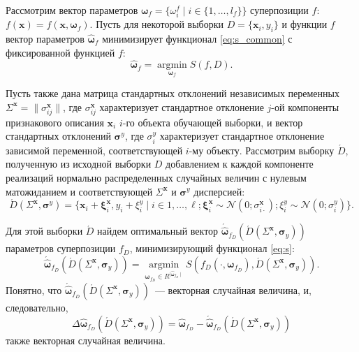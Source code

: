 \documentclass[12pt,a4paper]{article}
\theoremstyle{definition}
\begin{document}
Рассмотрим вектор параметров
$\boldsymbol{\omega}_f = \{ \omega_i^f \mid i \in \{ 1, \dots, l_f \} \}$
суперпозиции $f$: $f(\mathbf{x}) = f(\mathbf{x}, \boldsymbol{\omega}_f)$.
Пусть для некоторой выборки $D = \{ \mathbf{x}_i, y_i \}$ и функции
$f$ вектор параметров $\hat{\boldsymbol{\omega}}_f$ минимизирует
функционал \eqref{eq:s_common} с фиксированной функцией $f$:
\[
  \hat{\boldsymbol{\omega}}_f = \mathop{\arg \min}\limits_{\boldsymbol{\omega}_f} S(f, D).
\]

Пусть также дана матрица стандартных отклонений
независимых переменных $\Sigma^{\mathbf{x}} = \| \sigma^{\mathbf{x}}_{ij} \|$,
где $\sigma^{\mathbf{x}}_{ij}$ характеризует стандартное отклонение $j$-ой
компоненты признакового описания $\mathbf{x}_i$ $i$-го объекта обучающей выборки,
и вектор стандартных отклонений $\boldsymbol{\sigma}^y$, где $\sigma^y_i$
характеризует стандартное отклонение зависимой переменной, соответствующей
$i$-му объекту.
Рассмотрим выборку $\acute{D}$, полученную из исходной выборки $D$
добавлением к каждой компоненте реализаций нормально распределенных
случайных величин с нулевым матожиданием и соответствующей
$\Sigma^{\mathbf{x}}$ и $\boldsymbol{\sigma}^y$ дисперсией:
\begin{equation}
  \acute{D}(\Sigma^{\mathbf{x}}, \boldsymbol{\sigma}^y) = \{ \mathbf{x}_i + \boldsymbol{\xi}^{\mathbf{x}}_i, y_i + \xi^y_i \mid i \in 1, \dots, \ell; \boldsymbol{\xi}^{\mathbf{x}}_i \sim \mathcal{N}(0; \sigma^{\mathbf{x}}_{i \cdot}); \xi^y_i \sim \mathcal{N}(0; \sigma^y_i) \}.
  \label{eq:d_acute}
\end{equation}

Для этой выборки $\acute{D}$ найдем оптимальный вектор $\acute{\hat{\boldsymbol{\omega}}}_{f_D} (\acute{D} (\Sigma^{\mathbf{x}}, \boldsymbol{\sigma}_y))$
параметров суперпозиции $f_D$, минимизирующий функционал \eqref{eq:s}:
\begin{equation}
  \acute{\hat{\boldsymbol{\omega}}}_{f_D} (\acute{D} (\Sigma^{\mathbf{x}}, \boldsymbol{\sigma}_y)) = \mathop{\arg \min}\limits_{\boldsymbol{\omega}_{f_D} \in R^{\mid \hat{\boldsymbol{\omega}}_{f_D} \mid}} S (f_D (\cdot, \boldsymbol{\omega}_{f_D}), \acute{D} (\Sigma^{\mathbf{x}}, \boldsymbol{\sigma}_y)).
  \label{eq:hat_omega}
\end{equation}
Понятно, что $\acute{\hat{\boldsymbol{\omega}}}_{f_D} (\acute{D} (\Sigma^{\mathbf{x}}, \boldsymbol{\sigma}_y))$~---
векторная случайная величина, и, следовательно,
\[
  \Delta\hat{\boldsymbol{\omega}}_{f_D}(\acute{D} (\Sigma^{\mathbf{x}}, \boldsymbol{\sigma}_y) ) = \hat{\boldsymbol{\omega}}_{f_D} - \acute{\hat{\boldsymbol{\omega}}}_{f_D} (\acute{D} (\Sigma^{\mathbf{x}}, \boldsymbol{\sigma}_y))
\]
также векторная случайная величина.
\end{document}
